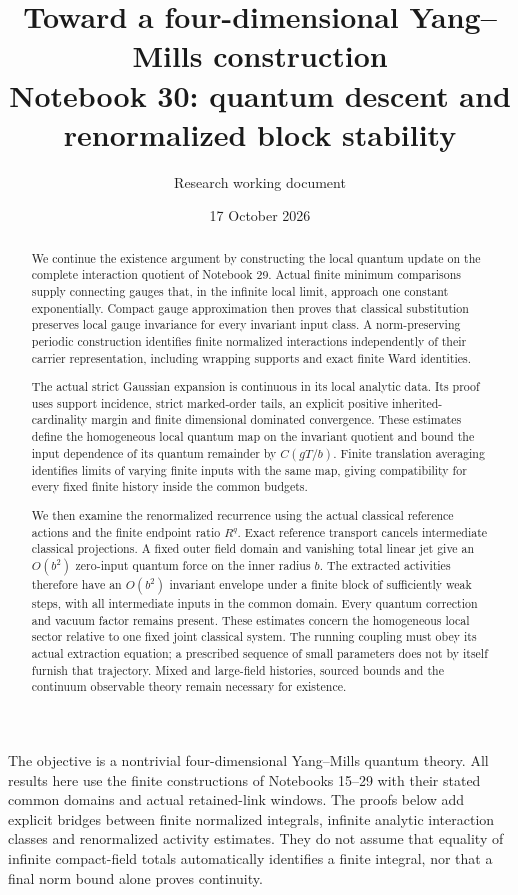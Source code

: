\documentclass[11pt]{article}
\title{Toward a four-dimensional Yang--Mills construction\\
\large Notebook 30: quantum descent and renormalized block stability}
\author{Research working document}
\date{17 October 2026}
\theoremstyle{remark}
\begin{document}
\maketitle
\begin{abstract}
We continue the existence argument by constructing the local quantum
update on the complete interaction quotient of Notebook 29.
Actual finite minimum comparisons supply connecting gauges that,
in the infinite local limit, approach one constant exponentially.
Compact gauge approximation then proves that classical substitution
preserves local gauge invariance for every invariant input class.
A norm-preserving periodic construction identifies finite normalized
interactions independently of their carrier representation, including
wrapping supports and exact finite Ward identities.

The actual strict Gaussian expansion is continuous in its local
analytic data. Its proof uses support incidence, strict marked-order
tails, an explicit positive inherited-cardinality margin and finite
dimensional dominated convergence. These estimates define the
homogeneous local quantum map on the invariant quotient and bound
the input dependence of its quantum remainder by
\(C(gT/b)\). Finite translation averaging identifies limits of varying
finite inputs with the same map, giving compatibility for every fixed
finite history inside the common budgets.

We then examine the renormalized recurrence using the actual classical
reference actions and the finite endpoint ratio \(R^q\).
Exact reference transport cancels intermediate classical projections.
A fixed outer field domain and vanishing total linear jet give
an \(O(b^2)\) zero-input quantum force on the inner radius \(b\).
The extracted activities therefore have an \(O(b^2)\) invariant
envelope under a finite block of sufficiently weak steps, with
all intermediate inputs in the common domain. Every quantum
correction and vacuum factor remains present. These estimates concern
the homogeneous local sector relative to one fixed joint classical
system. The running
coupling must obey its actual extraction equation; a prescribed
sequence of small parameters does not by itself furnish that
trajectory. Mixed and large-field histories, sourced bounds and
the continuum observable theory remain necessary for existence.
\end{abstract}

The objective is a nontrivial four-dimensional Yang--Mills quantum
theory. All results here use the finite constructions of Notebooks
15--29 with their stated common domains and actual retained-link
windows. The proofs below add explicit bridges between finite
normalized integrals, infinite analytic interaction classes and
renormalized activity estimates. They do not assume that equality
of infinite compact-field totals automatically identifies a finite
integral, nor that a final norm bound alone proves continuity.
\end{document}

